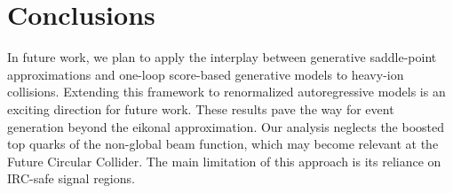 \section{Conclusions}\label{sec:conclusions}

In future work, we plan to apply the interplay between generative
saddle-point approximations and one-loop score-based generative models
to heavy-ion collisions. Extending this framework to renormalized
autoregressive models is an exciting direction for future work. These
results pave the way for event generation beyond the eikonal
approximation. Our analysis neglects the boosted top quarks of the
non-global beam function, which may become relevant at the Future
Circular Collider. The main limitation of this approach is its reliance
on IRC-safe signal regions.

